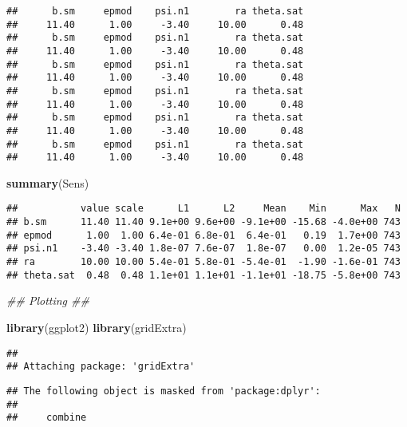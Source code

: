 \documentclass[
]{article}
\newenvironment{Shaded}{\begin{snugshade}}{\end{snugshade}}
\newcommand{\CommentTok}[1]{\textcolor[rgb]{0.56,0.35,0.01}{\textit{#1}}}
\newcommand{\KeywordTok}[1]{\textcolor[rgb]{0.13,0.29,0.53}{\textbf{#1}}}
\newcommand{\NormalTok}[1]{#1}
\begin{document}
\begin{verbatim}
##      b.sm     epmod    psi.n1        ra theta.sat 
##     11.40      1.00     -3.40     10.00      0.48 
##      b.sm     epmod    psi.n1        ra theta.sat 
##     11.40      1.00     -3.40     10.00      0.48 
##      b.sm     epmod    psi.n1        ra theta.sat 
##     11.40      1.00     -3.40     10.00      0.48 
##      b.sm     epmod    psi.n1        ra theta.sat 
##     11.40      1.00     -3.40     10.00      0.48 
##      b.sm     epmod    psi.n1        ra theta.sat 
##     11.40      1.00     -3.40     10.00      0.48 
##      b.sm     epmod    psi.n1        ra theta.sat 
##     11.40      1.00     -3.40     10.00      0.48
\end{verbatim}

\begin{Shaded}
\begin{Highlighting}[]
\KeywordTok{summary}\NormalTok{(Sens)}
\end{Highlighting}
\end{Shaded}

\begin{verbatim}
##           value scale      L1      L2     Mean    Min      Max   N
## b.sm      11.40 11.40 9.1e+00 9.6e+00 -9.1e+00 -15.68 -4.0e+00 743
## epmod      1.00  1.00 6.4e-01 6.8e-01  6.4e-01   0.19  1.7e+00 743
## psi.n1    -3.40 -3.40 1.8e-07 7.6e-07  1.8e-07   0.00  1.2e-05 743
## ra        10.00 10.00 5.4e-01 5.8e-01 -5.4e-01  -1.90 -1.6e-01 743
## theta.sat  0.48  0.48 1.1e+01 1.1e+01 -1.1e+01 -18.75 -5.8e+00 743
\end{verbatim}

\begin{Shaded}
\begin{Highlighting}[]
\CommentTok{## Plotting ##}

\KeywordTok{library}\NormalTok{(ggplot2)}
\KeywordTok{library}\NormalTok{(gridExtra)}
\end{Highlighting}
\end{Shaded}

\begin{verbatim}
## 
## Attaching package: 'gridExtra'
\end{verbatim}

\begin{verbatim}
## The following object is masked from 'package:dplyr':
## 
##     combine
\end{verbatim}
\end{document}
